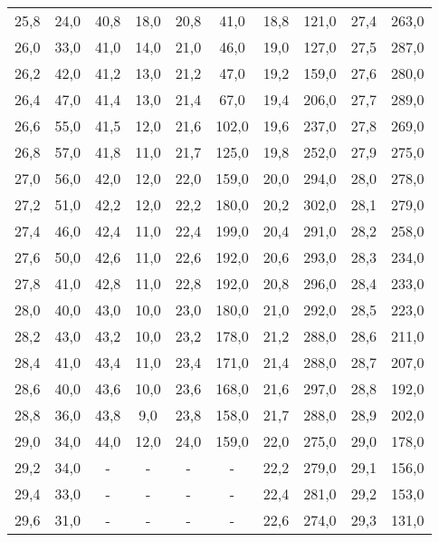 \begin{table}[htp]
\begin{center}
{\begin{tabular}{@{}cc|cc|cc|cc|cc@{}}
                        25,8 & 24,0 & 40,8 & 18,0 & 20,8 & 41,0 & 18,8 & 121,0 & 27,4 & 263,0\\
                        26,0 & 33,0 & 41,0 & 14,0 & 21,0 & 46,0 & 19,0 & 127,0 & 27,5 & 287,0\\
                        26,2 & 42,0 & 41,2 & 13,0 & 21,2 & 47,0 & 19,2 & 159,0 & 27,6 & 280,0\\
                        26,4 & 47,0 & 41,4 & 13,0 & 21,4 & 67,0 & 19,4 & 206,0 & 27,7 & 289,0\\
                        26,6 & 55,0 & 41,5 & 12,0 & 21,6 & 102,0 & 19,6 & 237,0 & 27,8 & 269,0\\
                        26,8 & 57,0 & 41,8 & 11,0 & 21,7 & 125,0 & 19,8 & 252,0 & 27,9 & 275,0\\
                        27,0 & 56,0 & 42,0 & 12,0 & 22,0 & 159,0 & 20,0 & 294,0 & 28,0 & 278,0\\
                        27,2 & 51,0 & 42,2 & 12,0 & 22,2 & 180,0 & 20,2 & 302,0 & 28,1 & 279,0\\
                        27,4 & 46,0 & 42,4 & 11,0 & 22,4 & 199,0 & 20,4 & 291,0 & 28,2 & 258,0\\
                        27,6 & 50,0 & 42,6 & 11,0 & 22,6 & 192,0 & 20,6 & 293,0 & 28,3 & 234,0\\
                        27,8 & 41,0 & 42,8 & 11,0 & 22,8 & 192,0 & 20,8 & 296,0 & 28,4 & 233,0\\
                        28,0 & 40,0 & 43,0 & 10,0 & 23,0 & 180,0 & 21,0 & 292,0 & 28,5 & 223,0\\
                        28,2 & 43,0 & 43,2 & 10,0 & 23,2 & 178,0 & 21,2 & 288,0 & 28,6 & 211,0\\
                        28,4 & 41,0 & 43,4 & 11,0 & 23,4 & 171,0 & 21,4 & 288,0 & 28,7 & 207,0\\
                        28,6 & 40,0 & 43,6 & 10,0 & 23,6 & 168,0 & 21,6 & 297,0 & 28,8 & 192,0\\
                        28,8 & 36,0 & 43,8 & 9,0 & 23,8 & 158,0 & 21,7 & 288,0 & 28,9 & 202,0\\
                        29,0 & 34,0 & 44,0 & 12,0 & 24,0 & 159,0 & 22,0 & 275,0 & 29,0 & 178,0\\
                        29,2 & 34,0 & - & - & - & - & 22,2 & 279,0 & 29,1 & 156,0\\
                        29,4 & 33,0 & - & - & - & - & 22,4 & 281,0 & 29,2 & 153,0\\
                        29,6 & 31,0 & - & - & - & - & 22,6 & 274,0 & 29,3 & 131,0\\

\end{tabular}}
\end{center}
\end{table}
